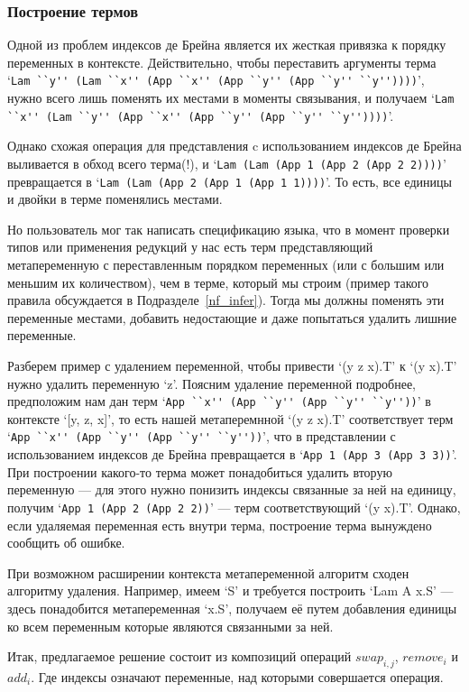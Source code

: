 \subsubsection{Построение термов}\label{build_exp}
Одной из проблем индексов де Брейна является их жесткая привязка к порядку переменных в контексте. Действительно, чтобы переставить аргументы терма `\lstinline{Lam ``y'' (Lam ``x'' (App ``x'' (App ``y'' (App ``y'' ``y''))))}', нужно всего лишь поменять их местами в моменты связывания, и получаем `\lstinline{Lam ``x'' (Lam ``y'' (App ``x'' (App ``y'' (App ``y'' ``y''))))}'.

Однако схожая операция для представления c использованием индексов де Брейна выливается в обход всего терма(!), и `\lstinline{Lam (Lam (App 1 (App 2 (App 2 2))))}' превращается в `\lstinline{Lam (Lam (App 2 (App 1 (App 1 1))))}'. То есть, все единицы и двойки в терме поменялись местами.

Но пользователь мог так написать спецификацию языка, что в момент проверки типов или применения редукций у нас есть терм представляющий метапеременную с переставленным порядком переменных (или с большим или меньшим их количеством), чем в терме, который мы строим (пример такого правила обсуждается в Подразделе~\ref{nf_infer}). Тогда мы должны поменять эти переменные местами, добавить недостающие и даже попытаться удалить лишние переменные.

Разберем пример с удалением переменной, чтобы привести `(y z x).T' к `(y x).T' нужно удалить переменную `z'. Поясним удаление переменной подробнее, предположим нам дан терм `\lstinline{App ``x'' (App ``y'' (App ``y'' ``y''))}' в контексте `[y, z, x]', то есть нашей метаперемнной `(y z x).T' соответствует терм `\lstinline{App ``x'' (App ``y'' (App ``y'' ``y''))}', что в представлении с использованием индексов де Брейна превращается в `\lstinline{App 1 (App 3 (App 3 3))}'. При построении какого-то терма может понадобиться удалить вторую переменную --- для этого нужно понизить индексы связанные за ней на единицу, получим `\lstinline{App 1 (App 2 (App 2 2))}' --- терм соответствующий `(y x).T'. Однако, если удаляемая переменная есть внутри терма, построение терма вынуждено сообщить об ошибке.

При возможном расширении контекста метапеременной алгоритм сходен алгоритму удаления. Например, имеем `S' и требуется построить `Lam A x.S' --- здесь понадобится метапеременная `x.S', получаем её путем добавления единицы ко всем переменным которые являются связанными за ней.

Итак, предлагаемое решение состоит из композиций операций $swap_{i,j}$, $remove_i$ и $add_i$. Где индексы означают переменные, над которыми совершается операция.

